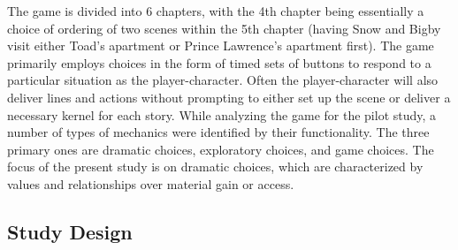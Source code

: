 The game is divided into 6 chapters, with the 4th chapter being
essentially a choice of ordering of two scenes within the 5th chapter
(having Snow and Bigby visit either Toad’s apartment or Prince
Lawrence’s apartment first). The game primarily employs choices in the
form of timed sets of buttons to respond to a particular situation as
the player-character. Often the player-character will also deliver
lines and actions without prompting to either set up the scene or
deliver a necessary kernel for each story. While analyzing the game
for the pilot study, a number of types of mechanics were identified by
their functionality. The three primary ones are dramatic choices,
exploratory choices, and game choices. The focus of the present study
is on dramatic choices, which are characterized by values and
relationships over material gain or access.
\subsection{Study Design}
\label{sec:orgheadline9}

